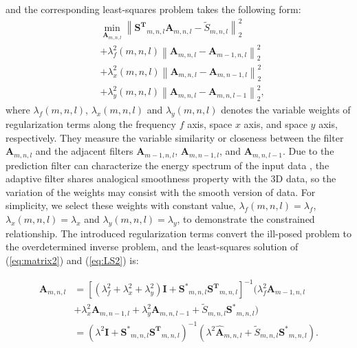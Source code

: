 and the corresponding least-squares problem takes the
following form:
\begin{equation}
    \label{eq:LS2}
    \begin{aligned}
         & \min_{\mathbf{A}_{m,n,l}} \left \|
        \mathbf{S^{T}}_{m,n,l} \mathbf{A}_{m,n,l}
        - \tilde{S}_{m,n,l} \right \|_{2}^{2}                                          \\
         & + \lambda_{f}^{2}(m,n,l) \left \| \mathbf{A}_{m,n,l} - \mathbf{A}_{m-1,n,l}
        \right \|_{2}^{2}                                                              \\
         & + \lambda_{x}^{2}(m,n,l) \left \| \mathbf{A}_{m,n,l} - \mathbf{A}_{m,n-1,l}
        \right \|_{2}^{2}                                                              \\
         & + \lambda_{y}^{2}(m,n,l) \left \| \mathbf{A}_{m,n,l} - \mathbf{A}_{m,n,l-1}
        \right \|_{2}^{2},
    \end{aligned}
\end{equation}
where $\lambda_{f}(m,n,l)$, $\lambda_{x}(m,n,l)$ and
$\lambda_{y}(m,n,l)$ denotes the variable weights of regularization
terms along the frequency $f$ axis, space $x$ axis, and space $y$
axis, respectively. They measure the variable similarity or closeness
between the filter $\mathbf{A}_{m,n,l}$ and the adjacent filters
$\mathbf{A}_{m-1,n,l}$, $\mathbf{A}_{m,n-1,l}$, and
$\mathbf{A}_{m,n,l-1}$.  Due to the prediction filter can characterize
the energy spectrum of the input data \cite{Claerbout76}, the adaptive
filter shares analogical smoothness property with the 3D data, so the
variation of the weights may consist with the smooth version of data.
For simplicity, we select these weights with constant value,
$\lambda_{f}(m,n,l) = \lambda_{f}$, $\lambda_{x}(m,n,l) = \lambda_{x}$
and $\lambda_{y}(m,n,l) = \lambda_{y}$, to demonstrate the constrained
relationship.  The introduced regularization terms convert the
ill-posed problem to the overdetermined inverse problem, and the
least-squares solution of (\ref{eq:matrix2}) and (\ref{eq:LS2}) is:
\begin{small}
    \begin{equation}
        \label{eq:solution2}
        \begin{aligned}
            \mathbf{A}_{m,n,l} & = [ (\lambda_{f}^{2} + \lambda_{x}^{2} + \lambda_{y}^{2})
            \mathbf{I} + \mathbf{S^{*}}_{m,n,l} \mathbf{S^{T}}_{m,n,l} ]^{-1}
            ( \lambda_{f}^{2} \mathbf{A}_{m-1,n,l}                                         \\
                               & + \lambda_{x}^{2} \mathbf{A}_{m,n-1,l}
            + \lambda_{y}^{2} \mathbf{A}_{m,n,l-1}
            + \tilde{S}_{m,n,l} \mathbf{S^{*}}_{m,n,l})                                    \\
                               & = (\lambda^{2} \mathbf{I}
            + \mathbf{S^{*}}_{m,n,l} \mathbf{S^{T}}_{m,n,l} )^{-1}
            (\lambda^{2}\mathbf{\hat{A}}_{m,n,l} + \tilde{S}_{m,n,l} \mathbf{S^{*}}_{m,n,l}).
        \end{aligned}
    \end{equation}
\end{small}
